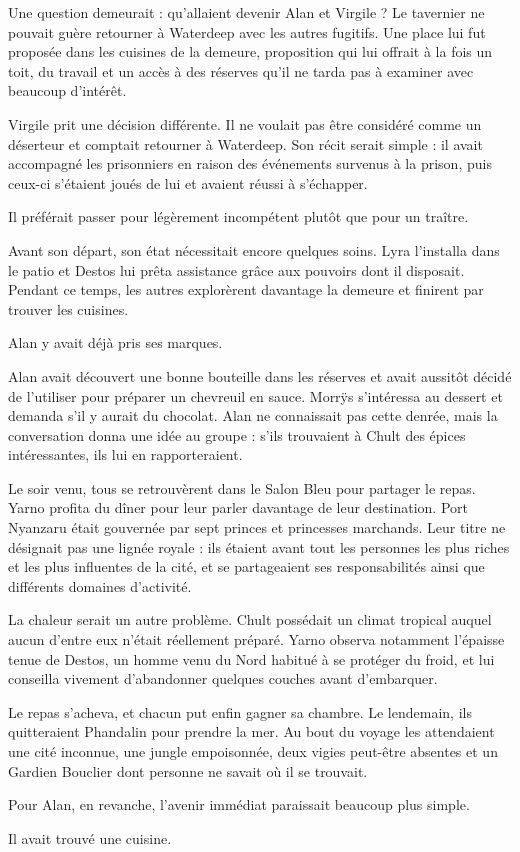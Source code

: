 \scenebreak

Une question demeurait : qu'allaient devenir Alan et Virgile ? Le tavernier ne pouvait guère retourner à Waterdeep avec les autres fugitifs. Une place lui fut proposée dans les cuisines de la demeure, proposition qui lui offrait à la fois un toit, du travail et un accès à des réserves qu'il ne tarda pas à examiner avec beaucoup d'intérêt.

Virgile prit une décision différente. Il ne voulait pas être considéré comme un déserteur et comptait retourner à Waterdeep. Son récit serait simple : il avait accompagné les prisonniers en raison des événements survenus à la prison, puis ceux-ci s'étaient joués de lui et avaient réussi à s'échapper.

Il préférait passer pour légèrement incompétent plutôt que pour un traître.

Avant son départ, son état nécessitait encore quelques soins. Lyra l'installa dans le patio et Destos lui prêta assistance grâce aux pouvoirs dont il disposait. Pendant ce temps, les autres explorèrent davantage la demeure et finirent par trouver les cuisines.

Alan y avait déjà pris ses marques.

Alan avait découvert une bonne bouteille dans les réserves et avait aussitôt décidé de l'utiliser pour préparer un chevreuil en sauce. Morrÿs s'intéressa au dessert et demanda s'il y aurait du chocolat. Alan ne connaissait pas cette denrée, mais la conversation donna une idée au groupe : s'ils trouvaient à Chult des épices intéressantes, ils lui en rapporteraient.

Le soir venu, tous se retrouvèrent dans le Salon Bleu pour partager le repas. Yarno profita du dîner pour leur parler davantage de leur destination. Port Nyanzaru était gouvernée par sept princes et princesses marchands. Leur titre ne désignait pas une lignée royale : ils étaient avant tout les personnes les plus riches et les plus influentes de la cité, et se partageaient ses responsabilités ainsi que différents domaines d'activité.

La chaleur serait un autre problème. Chult possédait un climat tropical auquel aucun d'entre eux n'était réellement préparé. Yarno observa notamment l'épaisse tenue de Destos, un homme venu du Nord habitué à se protéger du froid, et lui conseilla vivement d'abandonner quelques couches avant d'embarquer.

Le repas s'acheva, et chacun put enfin gagner sa chambre. Le lendemain, ils quitteraient Phandalin pour prendre la mer. Au bout du voyage les attendaient une cité inconnue, une jungle empoisonnée, deux vigies peut-être absentes et un Gardien Bouclier dont personne ne savait où il se trouvait.

Pour Alan, en revanche, l'avenir immédiat paraissait beaucoup plus simple.

Il avait trouvé une cuisine.
